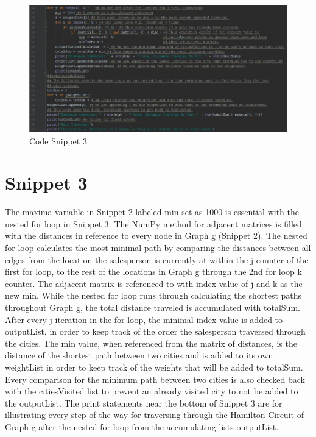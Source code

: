 \documentclass[a4paper,11pt]{scrartcl}
\begin{document}
\begin{figure}[!h]
  \centering
  \begin{minipage}[b]{0.85\textwidth}
    \includegraphics[width=\textwidth]{codepart3}
    \caption{Code Snippet 3}
  \end{minipage}
\end{figure}

\section{Snippet 3}

The maxima variable in Snippet 2 labeled min set as 1000 is essential with the nested for loop in Snippet 3. The NumPy method for adjacent matrices is filled with the distances in reference to every node in Graph g (Snippet 2). The nested for loop calculates the most minimal path by comparing the distances between all edges from the location the salesperson is currently at within the j counter of the first for loop, to the rest of the locations in Graph g through the 2nd for loop k counter. The adjacent matrix is referenced to with index value of j and k as the new min. While the nested for loop runs through calculating the shortest paths throughout Graph g, the total distance traveled is accumulated with totalSum.  After every j iteration in the for loop, the minimal index value is added to outputList, in order to keep track of the order the salesperson traversed through the cities.  The min value, when referenced from the matrix of distances, is the distance of the shortest path between two cities and is added to its own weightList in order to keep track of the weights that will be added to totalSum. Every comparison for the minimum path between two cities is also checked back with the citiesVisited list to prevent an already visited city to not be added to the outputList. The print statements near the bottom of Snippet 3 are for illustrating every step of the way for traversing through the Hamilton Circuit of Graph g after the nested for loop from the accumulating lists outputList.
\end{document}
